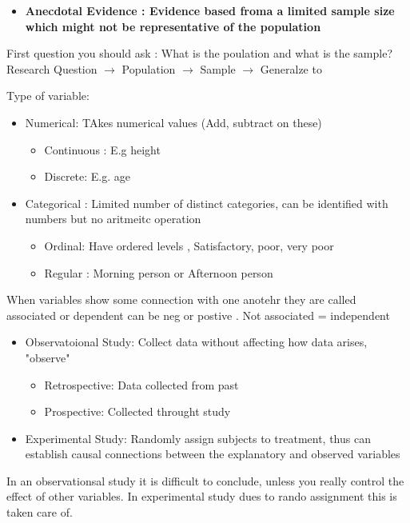 \documentclass[a4paper]{article}
\begin{document}
\begin{itemize}
\item \bf{Anecdotal Evidence} : Evidence based froma a limited sample size which might not be
representative of the population

\end{itemize}
First question you should ask : What is the poulation and what is the sample?
Research Question $\longrightarrow$ Population $\longrightarrow$ Sample $\longrightarrow$ Generalze to

Type of variable:
\begin{itemize}
\item Numerical: TAkes numerical values (Add, subtract on these)
\begin{itemize}
\item Continuous : E.g height
\item Discrete: E.g. age	
\end{itemize}
\item Categorical : Limited number of distinct categories, can be identified with numbers
but no aritmeitc operation
\begin{itemize}
\item Ordinal: Have ordered levels , Satisfactory, poor, very poor
\item Regular : Morning person or Afternoon person
\end{itemize}
\end{itemize}

When variables show some connection with one anotehr they are called associated or dependent
can be neg or postive . Not associated = independent


\begin{itemize}
\item Observatoional Study:  Collect data without affecting how data arises, "observe"
\begin{itemize}
\item Retrospective: Data collected from past
\item Prospective: Collected throught study
\end{itemize}
\item Experimental Study: Randomly assign subjects to treatment, thus can establish causal
connections between the explanatory and observed variables


\end{itemize}

In an observationsal study it is difficult to conclude, unless you really control the effect of other variables. In experimental study dues to rando assignment this is taken care of.
\end{document}
